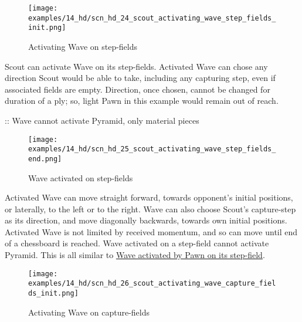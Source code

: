 \vspace*{-1.5\baselineskip}
\noindent
\begin{figure}[!h]
\texttt{[image: examples/14\_hd/scn\_hd\_24\_scout\_activating\_wave\_step\_fields\_init.png]}
\vspace*{-1.4\baselineskip}
\caption{Activating Wave on step-fields}
\label{fig:scn_hd_24_scout_activating_wave_step_fields_init}
\end{figure}

\vspace*{-0.5\baselineskip}
Scout can activate Wave on its step-fields. Activated Wave can chose any direction
Scout would be able to take, including any capturing step, even if associated fields
are empty.\newline
\indent
Direction, once chosen, cannot be changed for duration of a ply; so, light Pawn
in this example would remain out of reach.

\TODO :: Wave cannot activate Pyramid, only material pieces

\clearpage %

\vspace*{-2.3\baselineskip}
\noindent
\begin{figure}[!h]
\texttt{[image: examples/14\_hd/scn\_hd\_25\_scout\_activating\_wave\_step\_fields\_end.png]}
\vspace*{-1.4\baselineskip}
\caption{Wave activated on step-fields}
\label{fig:scn_hd_25_scout_activating_wave_step_fields_end}
\end{figure}

\vspace*{-0.5\baselineskip}
Activated Wave can move straight forward, towards opponent's initial positions, or
laterally, to the left or to the right. Wave can also choose Scout's capture-step
as its direction, and move diagonally backwards, towards own initial positions.\newline
\indent
Activated Wave is not limited by received momentum, and so can move until end of a
chessboard is reached. Wave activated on a step-field cannot activate Pyramid.\newline
\indent
This is all similar to
\hyperref[fig:scn_n_19_sideways_pawn_activated_wave]{Wave activated by Pawn on its step-field}.

\clearpage %

\vspace*{-2.3\baselineskip}
\noindent
\begin{figure}[!h]
\texttt{[image: examples/14\_hd/scn\_hd\_26\_scout\_activating\_wave\_capture\_fields\_init.png]}
\vspace*{-1.4\baselineskip}
\caption{Activating Wave on capture-fields}
\label{fig:scn_hd_26_scout_activating_wave_capture_fields_init}
\end{figure}

